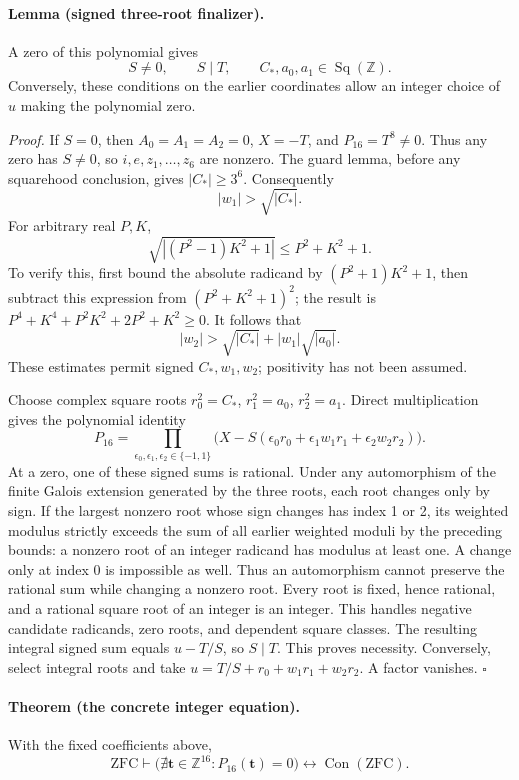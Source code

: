 \paragraph{Lemma (signed three-root finalizer).}
A zero of this polynomial gives
\[
 S\ne0,\qquad S\mid T,\qquad
 C_*,a_0,a_1\in\operatorname{Sq}(\mathbb Z).
 \tag{F}\label{eq:F16}
\]
Conversely, these conditions on the earlier coordinates allow an
integer choice of \(u\) making the polynomial zero.

\emph{Proof.}
If \(S=0\), then \(A_0=A_1=A_2=0\), \(X=-T\), and
\(P_{16}=T^8\ne0\).  Thus any zero has \(S\ne0\), so
\(i,e,z_1,\ldots,z_6\) are nonzero.  The guard lemma, before
any squarehood conclusion, gives \(|C_*|\ge3^6\).
Consequently
\[
 |w_1|>\sqrt{|C_*|}.
\]
For arbitrary real \(P,K\),
\[
 \sqrt{|(P^2-1)K^2+1|}\le P^2+K^2+1.
\]
To verify this, first bound the absolute radicand by
\((P^2+1)K^2+1\), then subtract this expression from
\((P^2+K^2+1)^2\); the result is
\(P^4+K^4+P^2K^2+2P^2+K^2\ge0\).
It follows that
\[
 |w_2|>\sqrt{|C_*|}+|w_1|\sqrt{|a_0|}.
\]
These estimates permit signed \(C_*,w_1,w_2\); positivity has
not been assumed.

Choose complex square roots \(r_0^2=C_*\), \(r_1^2=a_0\),
\(r_2^2=a_1\).  Direct multiplication gives the polynomial identity
\[
 P_{16}=\prod_{\epsilon_0,\epsilon_1,\epsilon_2\in\{-1,1\}}
 \bigl(X-S(\epsilon_0r_0+\epsilon_1w_1r_1+
                                \epsilon_2w_2r_2)\bigr).
\]
At a zero, one of these signed sums is rational.  Under any
automorphism of the finite Galois extension generated by the three
roots, each root changes only by sign.  If the largest nonzero root
whose sign changes has index 1 or 2, its weighted modulus strictly
exceeds the sum of all earlier weighted moduli by the preceding
bounds: a nonzero root of an integer radicand has modulus at least
one.  A change only at index 0 is impossible as well.  Thus an
automorphism cannot preserve the rational sum while changing a
nonzero root.  Every root is fixed, hence rational, and a rational
square root of an integer is an integer.  This handles negative
candidate radicands, zero roots, and dependent square classes.
The resulting integral signed sum equals \(u-T/S\), so
\(S\mid T\).  This proves necessity.
Conversely, select integral roots and take
\(u=T/S+r_0+w_1r_1+w_2r_2\).  A factor vanishes.
\hfill\(\square\)

\paragraph{Theorem (the concrete integer equation).}
With the fixed coefficients above,
\[
 \mathrm{ZFC}\vdash
 \bigl(\nexists\mathbf t\in\mathbb Z^{16}:
                           P_{16}(\mathbf t)=0\bigr)
 \longleftrightarrow\operatorname{Con}(\mathrm{ZFC}).
\]

